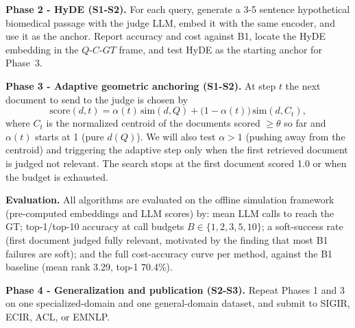 \documentclass[11pt,a4paper]{article}
\begin{document}
\textbf{Phase 2 - HyDE (S1-S2).} For each query, generate a 3-5 sentence hypothetical biomedical passage with the judge LLM, embed it with the same encoder, and use it as the anchor. Report accuracy and cost against B1, locate the HyDE embedding in the $Q$-$C$-$GT$ frame, and test HyDE as the starting anchor for Phase~3.

\textbf{Phase 3 - Adaptive geometric anchoring (S1-S2).} At step $t$ the next document to send to the judge is chosen by
\begin{equation}
  \text{score}(d,t) = \alpha(t)\,\text{sim}(d,Q) + \bigl(1-\alpha(t)\bigr)\,\text{sim}(d,C_t),
\end{equation}
where $C_t$ is the normalized centroid of the documents scored $\geq\theta$ so far and $\alpha(t)$ starts at 1 (pure $d(Q)$). We will also test $\alpha>1$ (pushing away from the centroid) and triggering the adaptive step only when the first retrieved document is judged not relevant. The search stops at the first document scored 1.0 or when the budget is exhausted.

\textbf{Evaluation.} All algorithms are evaluated on the offline simulation framework (pre-computed embeddings and LLM scores) by: mean LLM calls to reach the GT; top-1/top-10 accuracy at call budgets $B\in\{1,2,3,5,10\}$; a soft-success rate (first document judged fully relevant, motivated by the finding that most B1 failures are soft); and the full cost-accuracy curve per method, against the B1 baseline (mean rank 3.29, top-1 70.4\%).

\textbf{Phase 4 - Generalization and publication (S2-S3).} Repeat Phases 1 and 3 on one specialized-domain and one general-domain dataset, and submit to SIGIR, ECIR, ACL, or EMNLP.
\end{document}
